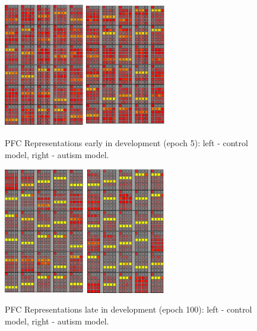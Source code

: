 \begin{figure}[t]
\begin{center}
	\includegraphics[width=35mm,height=55mm]{graphs/PFCwts1.05.eps}
	\hspace{18 mm}
	\includegraphics[width=35mm,height=55mm]{graphs/PFCwts54.05.eps}
\end{center}
\caption{PFC Representations early in development
         (epoch 5): left - control model, right -
         autism model.}
\label{rep1-figure}
\end{figure} 

\begin{figure}[th]
\begin{center}
	\includegraphics[width=35mm,height=55mm]{graphs/PFCwts1.100.eps}
	\hspace{18 mm}
	\includegraphics[width=35mm,height=55mm]{graphs/PFCwts54.100.eps}
\end{center}
\caption{PFC Representations late in development
         (epoch 100): left - control model, right -
         autism model.}  
\label{rep2-figure}
\end{figure} 


